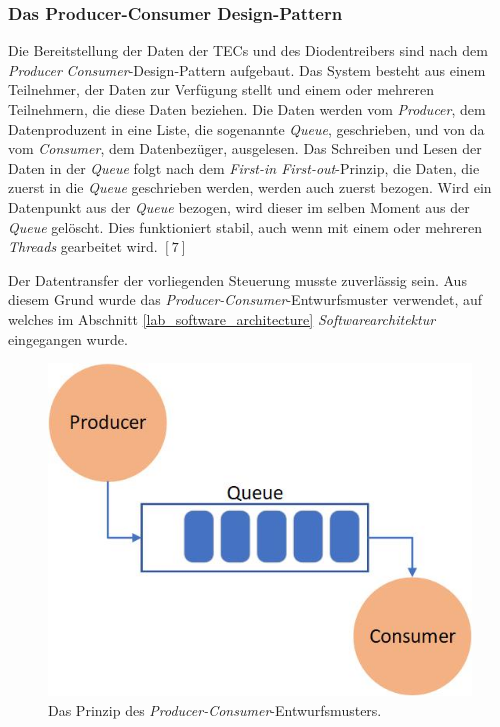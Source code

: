 \subsubsection{Das Producer-Consumer Design-Pattern}
\label{section:_producer_consumer}
Die Bereitstellung der Daten der TECs und des Diodentreibers sind nach dem \textit{Producer} \textit{Consumer}-Design-Pattern aufgebaut. Das System besteht aus einem Teilnehmer, der Daten zur Verfügung stellt und einem oder mehreren Teilnehmern, die diese Daten beziehen. Die Daten werden vom \textit{Producer}, dem Datenproduzent in eine Liste, die sogenannte \textit{Queue}, geschrieben, und von da vom \textit{Consumer}, dem Datenbezüger, ausgelesen. Das Schreiben und Lesen der Daten in der \textit{Queue} folgt nach dem \textit{First-in First-out}-Prinzip, die Daten, die zuerst in die \textit{Queue} geschrieben werden, werden auch zuerst bezogen. Wird ein Datenpunkt aus der \textit{Queue} bezogen, wird dieser im selben Moment aus der \textit{Queue} gelöscht. Dies funktioniert stabil, auch wenn mit einem oder mehreren \textit{Threads} gearbeitet wird. $[7]$

Der Datentransfer der vorliegenden Steuerung musste zuverlässig sein. Aus diesem Grund wurde das \textit{Producer-Consumer}-Entwurfsmuster verwendet, auf welches im Abschnitt \ref{lab_software_architecture}  \textit{Softwarearchitektur} eingegangen wurde.

\begin{figure}[H]
    \centering
    \includegraphics[scale=0.5]{98_images/producer_consumer_design_pattern.jpg}
    \caption{Das Prinzip des \textit{Producer-Consumer}-Entwurfsmusters.}
    \label{fig:_producer_consumer}
 \end{figure}

